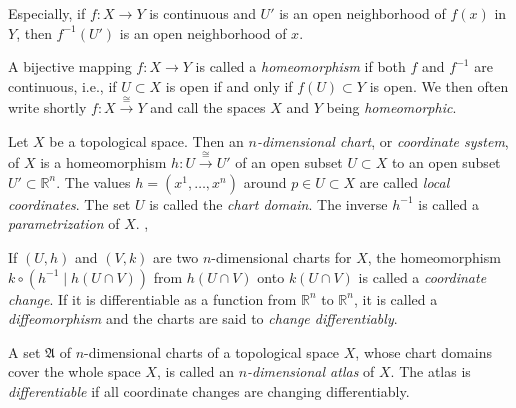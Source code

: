 \begin{bem}
	Especially, if $f:X \to Y$ is continuous and $U'$ is an open neighborhood of $f(x)$ in $Y$, then $f^{-1}(U')$ is an open neighborhood of $x$.
\end{bem}

A bijective mapping $f: X \to Y$ is called a \emph{homeomorphism} if both $f$ and $f^{-1}$ are continuous, i.e., if $U \subset X$ is open if and only if $f(U) \subset Y$ is open. \cite[17]{Jaenich-1999} 
We then often write shortly $f : X \stackrel{\cong}{\to} Y$ and call the spaces $X$ and $Y$ being \emph{homeomorphic}.





\begin{definition}
	Let $X$ be a topological space. 
	Then an 
	\emph{$n$-dimensional chart},
	or \emph{coordinate system},
	of $X$ 
	is a homeomorphism $h: U \stackrel{\cong}{\to} U'$
	of an open subset $U \subset X$ to an open subset $U' \subset \mathbb{R}^n$.
	The values $h = (x^1, \ldots, x^n)$ around $p \in U \subset X$ are called \emph{local coordinates}.
	The set $U$ is called the \emph{chart domain}.
	The inverse $h^{-1}$ is called a \emph{parametrization} of $X$.
	\cite[1]{Jaenich-1992}, \cite[369]{Jaenich-2001}
\end{definition}

\begin{definition}
	If $(U,h)$ and $(V,k)$ are two $n$-dimensional charts for $X$, the homeomorphism
	$
	k \circ (h^{-1} \mid h(U \cap V))
	$
	from $h(U \cap V)$ onto $k(U \cap V)$ is called a \emph{coordinate change}.
	If it is differentiable as a function from $\mathbb{R}^n$ to $\mathbb{R}^n$, it is called a \emph{diffeomorphism} and the charts are said to \emph{change differentiably}.
\end{definition}

\begin{definition}
	A set $\mathfrak{A}$ of $n$-dimensional charts of a topological space $X$, whose chart domains cover the whole space $X$, is called an \emph{$n$-dimensional atlas} of $X$.
	The atlas is \emph{differentiable} if all coordinate changes are changing differentiably.
\end{definition}

